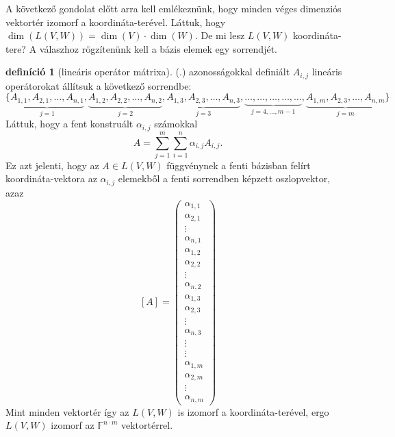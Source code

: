 \documentclass[9pt, a4paper, showtrims]{memoir}
\let\Aref\relax
\theoremstyle{plain}
\theoremstyle{remark}
\theoremstyle{definition}
\newtheorem{definition}[proposition]{definíció}
\begin{document}
A következő gondolat előtt arra kell emlékeznünk,
hogy minden véges dimenziós vektortér izomorf a koordináta-terével.
Láttuk, hogy $\dim \left( L\left( V,W \right) \right)=\dim(V)\cdot\dim(W)$.
De mi lesz $L\left( V,W \right)$ koordináta-tere?
A válaszhoz rögzítenünk kell a bázis elemek egy sorrendjét.
\begin{definition}[lineáris operátor mátrixa]
	(\Aref{eq:aij}.) azonosságokkal definiált $A_{i,j}$ lineáris operátorokat állítsuk a következő sorrendbe:
	\[
		\{
		\underbrace{A_{1,1},A_{2,1},\ldots,A_{n,1}}_{j=1},
		\underbrace{A_{1,2},A_{2,2},\ldots,A_{n,2}}_{j=2},
		\underbrace{A_{1,3},A_{2,3},\ldots,A_{n,3}}_{j=3},
		\underbrace{\dots,\ldots,\dots,\ldots,\dots}_{j=4,\ldots,m-1},
		\underbrace{A_{1,m},A_{2,3},\ldots,A_{n,m}}_{j=m}
		\}
	\]
	Láttuk, hogy a fent konstruált $\alpha_{i,j}$ számokkal
	\[
		A=
		\sum_{j=1}^m\sum_{i=1}^n\alpha_{i,j}A_{i,j}.
	\]
	Ez azt jelenti, hogy az $A\in L\left( V,W \right)$ függvénynek a fenti bázisban felírt koordináta-vektora
	az $\alpha_{i,j}$ elemekből a fenti sorrendben képzett oszlopvektor, azaz
	\[
		\left[ A \right]=
		\begin{pmatrix}
			\alpha_{1,1} \\ \alpha_{2,1}\\ \vdots \\ \alpha_{n,1}\\
			\alpha_{1,2} \\ \alpha_{2,2}\\ \vdots \\ \alpha_{n,2}\\
			\alpha_{1,3} \\ \alpha_{2,3}\\ \vdots \\ \alpha_{n,3}\\
			\vdots       \\ \vdots\\
			\alpha_{1,m} \\ \alpha_{2,m}\\ \vdots \\ \alpha_{n,m}
		\end{pmatrix}\tag{\dag}
	\]
	Mint minden vektortér így az $L\left( V,W \right)$ is izomorf a koordináta-terével, ergo $L\left( V,W \right)$ izomorf
	az $\mathbb{F}^{n\cdot m}$ vektortérrel.


\end{definition}
\end{document}
